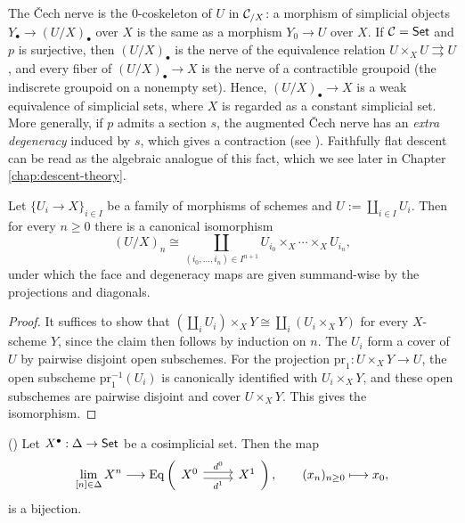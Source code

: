 \begin{remark}\label{rem:cech-homotopy}
	The \v{C}ech nerve is the $0$-coskeleton of $U$ in $\mathcal{C}_{/X}$: a morphism of simplicial objects $Y_\bullet\to(U/X)_\bullet$ over $X$ is the same as a morphism $Y_0\to U$ over $X$. If $\mathcal{C}=\mathsf{Set}$ and $p$ is surjective, then $(U/X)_\bullet$ is the nerve of the equivalence relation $U\times_X U\rightrightarrows U$, and every fiber of $(U/X)_\bullet\to X$ is the nerve of a contractible groupoid (the indiscrete groupoid on a nonempty set). Hence, $(U/X)_\bullet\to X$ is a weak equivalence of simplicial sets, where $X$ is regarded as a constant simplicial set.
	More generally, if $p$ admits a section $s$, the augmented \v{C}ech nerve has an \emph{extra degeneracy} induced by $s$, which gives a contraction (see \cite[][Tag 019Z]{stacks-project}). Faithfully flat descent can be read as the algebraic analogue of this fact, which we see later in Chapter \ref{chap:descent-theory}.
\end{remark}

\begin{lemma}\label{lem:cech-nerve-coproduct}
	Let $\{U_i\to X\}_{i\in I}$ be a family of morphisms of schemes and $U:=\coprod_{i\in I}U_i$. Then for every $n\ge 0$ there is a canonical isomorphism
	\[
	(U/X)_n\cong\coprod_{(i_0,\dots,i_n)\in I^{n+1}}U_{i_0}\times_X\cdots\times_X U_{i_n},
	\]
	under which the face and degeneracy maps are given summand-wise by the projections and diagonals.
\end{lemma}

\begin{proof}
	It suffices to show that $(\coprod_i U_i)\times_X Y\cong\coprod_i(U_i\times_X Y)$ for every $X$-scheme $Y$, since the claim then follows by induction on $n$. The $U_i$ form a cover of $U$ by pairwise disjoint open subschemes. For the projection $\mathrm{pr}_1:U\times_XY\to U$, the open subscheme $\mathrm{pr}_1^{-1}(U_i)$ is canonically identified with $U_i\times_XY$, and these open subschemes are pairwise disjoint and cover $U\times_XY$. This gives the isomorphism.
\end{proof}

\begin{lemma}\label{lem:tot-cosimplicial-set}
	(\cite[][Section~1, Lemma~1]{jardine2019cosimplicial})
	Let $X^\bullet:\Delta\to\mathsf{Set}$ be a cosimplicial set. Then the map
	\[
	\lim_{[n]\in\Delta}X^n\longrightarrow\Eq\left(\begin{tikzcd}X^0\arrow[r, shift left, "d^0"]\arrow[r, shift right, "d^1"'] & X^1\end{tikzcd}\right),\qquad (x_n)_{n\ge 0}\longmapsto x_0,
	\]
	is a bijection. 
\end{lemma}

